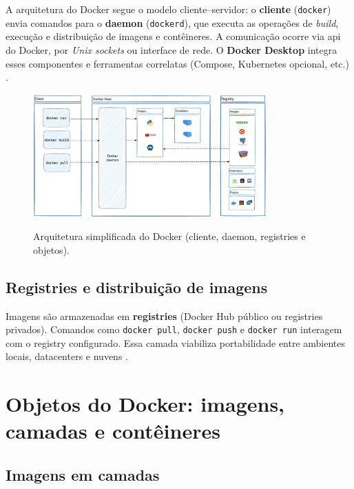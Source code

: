 A arquitetura do Docker segue o modelo cliente–servidor: o \textbf{cliente} (\texttt{docker}) envia comandos para o \textbf{daemon} (\texttt{dockerd}), que executa as operações de \textit{build}, execução e distribuição de imagens e contêineres. A comunicação ocorre via \acrshort{api} do Docker, por \textit{Unix sockets} ou interface de rede. O \textbf{Docker Desktop} integra esses componentes e ferramentas correlatas (Compose, Kubernetes opcional, etc.) \cite{docker_overview}. 

\begin{figure}[H]
  \centering
  \caption{Arquitetura simplificada do Docker (cliente, daemon, registries e objetos).}
  \includegraphics[width=0.8\textwidth]{media/docker_architecture.png}
  \label{fig:docker-arquitetura}
\end{figure}

\subsection{Registries e distribuição de imagens}
\label{subsec:docker-registries}

Imagens são armazenadas em \textbf{registries} (Docker Hub público ou registries privados). Comandos como \texttt{docker pull}, \texttt{docker push} e \texttt{docker run} interagem com o registry configurado. Essa camada viabiliza portabilidade entre ambientes locais, datacenters e nuvens \cite{docker_overview}. 

\section{Objetos do Docker: imagens, camadas e contêineres}
\label{sec:docker-objetos}

\subsection{Imagens em camadas}
\label{subsec:docker-imagens}


